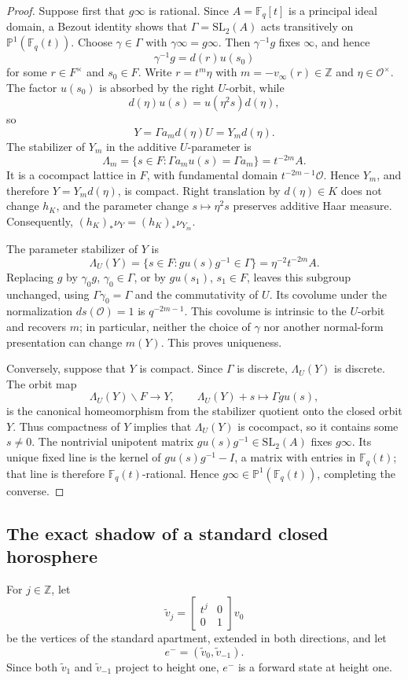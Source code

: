 \documentclass[11pt]{amsart}
\theoremstyle{definition}
\theoremstyle{plain}
\newcommand{\Fq}{\mathbb F_q}
\newcommand{\cO}{\mathcal O}
\newcommand{\ZZ}{\mathbb Z}
\begin{document}
\begin{proof}
Suppose first that \(g\infty\) is rational.  Since \(A=\Fq[t]\) is a
principal ideal domain, a Bezout identity shows that
\(\Gamma=\mathrm{SL}_2(A)\) acts transitively on
\(\mathbb P^1(\Fq(t))\).  Choose \(\gamma\in\Gamma\) with
\(\gamma\infty=g\infty\).  Then \(\gamma^{-1}g\) fixes \(\infty\), and hence
\[
\gamma^{-1}g=d(r)u(s_0)
\]
for some \(r\in F^\times\) and \(s_0\in F\).  Write \(r=t^m\eta\) with
\(m=-v_\infty(r)\in\ZZ\) and \(\eta\in\cO^\times\).  The factor \(u(s_0)\)
is absorbed by the right \(U\)-orbit, while
\[
d(\eta)u(s)=u(\eta^2s)d(\eta),
\]
so
\[
Y=\Gamma a_m d(\eta)U=Y_m d(\eta).
\]
The stabilizer of \(Y_m\) in the additive \(U\)-parameter is
\[
\Lambda_m=\{s\in F:\Gamma a_mu(s)=\Gamma a_m\}=t^{-2m}A.
\]
It is a cocompact lattice in \(F\), with fundamental domain
\(t^{-2m-1}\cO\).  Hence \(Y_m\), and therefore \(Y=Y_md(\eta)\), is compact.
Right translation by \(d(\eta)\in K\) does not change \(h_K\), and the
parameter change \(s\mapsto\eta^2s\) preserves additive Haar measure.
Consequently,
\((h_K)_*\nu_Y=(h_K)_*\nu_{Y_m}\).

The parameter stabilizer of \(Y\) is
\[
\Lambda_U(Y)=\{s\in F:gu(s)g^{-1}\in\Gamma\}
          =\eta^{-2}t^{-2m}A.
\]
Replacing \(g\) by \(\gamma_0g\), \(\gamma_0\in\Gamma\), or by
\(gu(s_1)\), \(s_1\in F\), leaves this subgroup unchanged, using
\(\Gamma\gamma_0=\Gamma\) and the commutativity of \(U\).  Its covolume under
the normalization \(ds(\cO)=1\) is
\(q^{-2m-1}\).  This covolume is intrinsic to the \(U\)-orbit and recovers
\(m\); in particular, neither the choice of \(\gamma\) nor another normal-form
presentation can change \(m(Y)\).  This proves uniqueness.

Conversely, suppose that \(Y\) is compact.  Since \(\Gamma\) is discrete,
\(\Lambda_U(Y)\) is discrete.  The orbit map
\[
\Lambda_U(Y)\backslash F\longrightarrow Y,
\qquad \Lambda_U(Y)+s\longmapsto\Gamma gu(s),
\]
is the canonical homeomorphism from the stabilizer quotient onto the closed
orbit \(Y\).  Thus compactness of \(Y\) implies that \(\Lambda_U(Y)\) is
cocompact, so it contains some \(s\ne0\).  The nontrivial unipotent matrix
\(gu(s)g^{-1}\in\mathrm{SL}_2(A)\) fixes \(g\infty\).  Its unique fixed line
is the kernel of \(gu(s)g^{-1}-I\), a matrix with entries in \(\Fq(t)\); that
line is therefore \(\Fq(t)\)-rational.  Hence
\(g\infty\in\mathbb P^1(\Fq(t))\), completing the converse.
\end{proof}

\subsection{The exact shadow of a standard closed horosphere}
For \(j\in\ZZ\), let
\[
\widetilde v_j=
 \begin{bmatrix}t^j&0\\0&1\end{bmatrix}v_0
\]
be the vertices of the standard apartment, extended in both directions, and
let
\[
e^-=(\widetilde v_0,\widetilde v_{-1}).
\]
Since both \(\widetilde v_1\) and \(\widetilde v_{-1}\) project to height one,
\(e^-\) is a forward state at height one.
\end{document}
